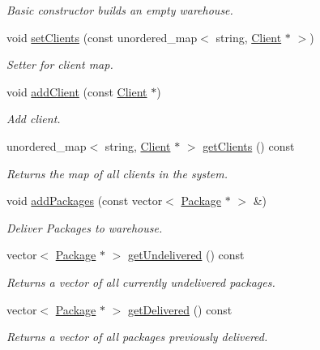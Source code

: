 \begin{DoxyCompactItemize}
\begin{DoxyCompactList}\small\item\em Basic constructor builds an empty warehouse. \end{DoxyCompactList}\item 
void \hyperlink{classWarehouse_ae34b31372ac5b88ddfbb841792203942}{set\+Clients} (const unordered\+\_\+map$<$ string, \hyperlink{classClient}{Client} $\ast$ $>$)
\begin{DoxyCompactList}\small\item\em Setter for client map. \end{DoxyCompactList}\item 
void \hyperlink{classWarehouse_ae38e63867176c4dbe6c6d1018a8e912f}{add\+Client} (const \hyperlink{classClient}{Client} $\ast$)
\begin{DoxyCompactList}\small\item\em Add client. \end{DoxyCompactList}\item 
unordered\+\_\+map$<$ string, \hyperlink{classClient}{Client} $\ast$ $>$ \hyperlink{classWarehouse_aed07586c0e5d5a64e2afd10cb82af30d}{get\+Clients} () const 
\begin{DoxyCompactList}\small\item\em Returns the map of all clients in the system. \end{DoxyCompactList}\item 
void \hyperlink{classWarehouse_ac0a2aded6c845255581f092c95fc0535}{add\+Packages} (const vector$<$ \hyperlink{classPackage}{Package} $\ast$ $>$ \&)
\begin{DoxyCompactList}\small\item\em Deliver Packages to warehouse. \end{DoxyCompactList}\item 
vector$<$ \hyperlink{classPackage}{Package} $\ast$ $>$ \hyperlink{classWarehouse_a0f6cf8ed8203d656e3ff2b7ba290fce1}{get\+Undelivered} () const 
\begin{DoxyCompactList}\small\item\em Returns a vector of all currently undelivered packages. \end{DoxyCompactList}\item 
vector$<$ \hyperlink{classPackage}{Package} $\ast$ $>$ \hyperlink{classWarehouse_ab4c36cb124eefaf518e4fc8aa9be3ac7}{get\+Delivered} () const 
\begin{DoxyCompactList}\small\item\em Returns a vector of all packages previously delivered. \end{DoxyCompactList}\item 

\end{DoxyCompactItemize}

